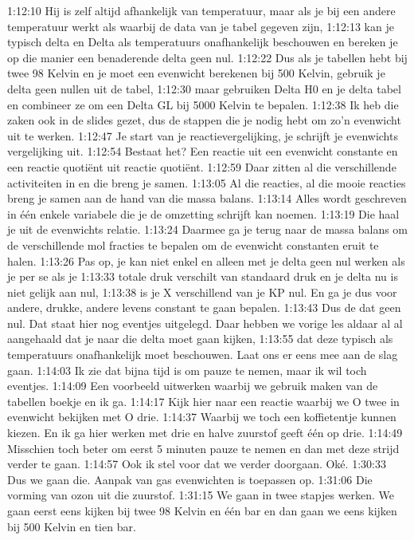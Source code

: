 1:12:10
Hij is zelf altijd afhankelijk van temperatuur, maar als je bij een andere temperatuur werkt als waarbij de data van je tabel gegeven zijn,
1:12:13
kan je typisch delta en Delta als temperatuurs onafhankelijk beschouwen en bereken je op die manier een benaderende delta geen nul.
1:12:22
Dus als je tabellen hebt bij twee 98 Kelvin en je moet een evenwicht berekenen bij 500 Kelvin, gebruik je delta geen nullen uit de tabel,
1:12:30
maar gebruiken Delta H0 en je delta tabel en combineer ze om een Delta GL bij 5000 Kelvin te bepalen.
1:12:38
Ik heb die zaken ook in de slides gezet, dus de stappen die je nodig hebt om zo'n evenwicht uit te werken.
1:12:47
Je start van je reactievergelijking, je schrijft je evenwichts vergelijking uit.
1:12:54
Bestaat het? Een reactie uit een evenwicht constante en een reactie quotiënt uit reactie quotiënt.
1:12:59
Daar zitten al die verschillende activiteiten in en die breng je samen.
1:13:05
Al die reacties, al die mooie reacties breng je samen aan de hand van die massa balans.
1:13:14
Alles wordt geschreven in één enkele variabele die je de omzetting schrijft kan noemen.
1:13:19
Die haal je uit de evenwichts relatie.
1:13:24
Daarmee ga je terug naar de massa balans om de verschillende mol fracties te bepalen om de evenwicht constanten eruit te halen.
1:13:26
Pas op, je kan niet enkel en alleen met je delta geen nul werken als je per se als je
1:13:33
totale druk verschilt van standaard druk en je delta nu is niet gelijk aan nul,
1:13:38
is je X verschillend van je KP nul. En ga je dus voor andere, drukke, andere levens constant te gaan bepalen.
1:13:43
Dus de dat geen nul. Dat staat hier nog eventjes uitgelegd. Daar hebben we vorige les aldaar al al aangehaald dat je naar die delta moet gaan kijken,
1:13:55
dat deze typisch als temperatuurs onafhankelijk moet beschouwen. Laat ons er eens mee aan de slag gaan.
1:14:03
Ik zie dat bijna tijd is om pauze te nemen, maar ik wil toch eventjes.
1:14:09
Een voorbeeld uitwerken waarbij we gebruik maken van de tabellen boekje en ik ga.
1:14:17
Kijk hier naar een reactie waarbij we O twee in evenwicht bekijken met O drie.
1:14:37
Waarbij we toch een koffietentje kunnen kiezen. En ik ga hier werken met drie en halve zuurstof geeft één op drie.
1:14:49
Misschien toch beter om eerst 5 minuten pauze te nemen en dan met deze strijd verder te gaan.
1:14:57
Ook ik stel voor dat we verder doorgaan. Oké.
1:30:33
Dus we gaan die. Aanpak van gas evenwichten is toepassen op.
1:31:06
Die vorming van ozon uit die zuurstof.
1:31:15
We gaan in twee stapjes werken. We gaan eerst eens kijken bij twee 98 Kelvin en één bar en dan gaan we eens kijken bij 500 Kelvin en tien bar.
